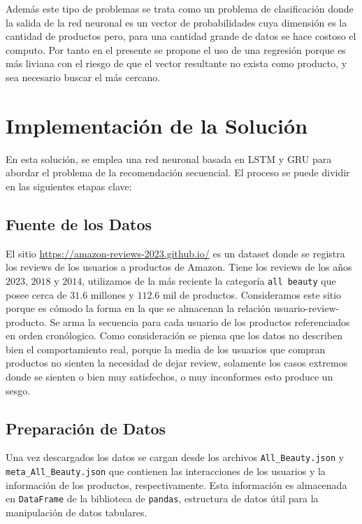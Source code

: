 \documentclass[runningheads]{llncs}
\begin{document}
Además este tipo de problemas se trata como un problema de clasificación donde la salida de la red neuronal es un vector de probabilidades cuya dimensión es la cantidad de productos pero, para una cantidad grande de datos se hace costoso el computo. Por tanto en el presente se propone el uso de una regresión porque es más liviana con el riesgo de que el vector resultante no exista como producto, y sea necesario buscar el más cercano.

\section{Implementación de la Solución}

En esta solución, se emplea una red neuronal basada en LSTM y GRU para abordar el problema de la recomendación secuencial. El proceso se puede dividir en las siguientes etapas clave:

\subsection{Fuente de los Datos}

El sitio \url{https://amazon-reviews-2023.github.io/} es un dataset donde se registra los reviews de los usuarios a productos de Amazon. Tiene los reviews de los años $2023$, $2018$ y $2014$, utilizamos de la más reciente la categoría \texttt{all beauty} que posee cerca de $31.6$ millones y $112.6$ mil de productos. Consideramos este sitio porque es c\'omodo la forma en la que se almacenan la relaci\'on usuario-review-producto. Se arma la secuencia para cada usuario de los productos referenciados en orden cron\'ologico. Como consideraci\'on se piensa que los datos no describen bien el comportamiento real, porque la media de los usuarios que compran productos no sienten la necesidad de dejar review, solamente los casos extremos donde se sienten o bien muy satisfechos, o muy inconformes esto produce un sesgo.

\subsection{Preparación de Datos}

Una vez descargados los datos se cargan desde los archivos \texttt{All\_Beauty.json} y \texttt{meta\_All\_Beauty.json} que contienen las interacciones de los usuarios y la información de los productos, respectivamente. Esta información es almacenada en \texttt{DataFrame} de la biblioteca de \texttt{pandas}, estructura de datos \'util para la manipulaci\'on de datos tabulares.
\end{document}
